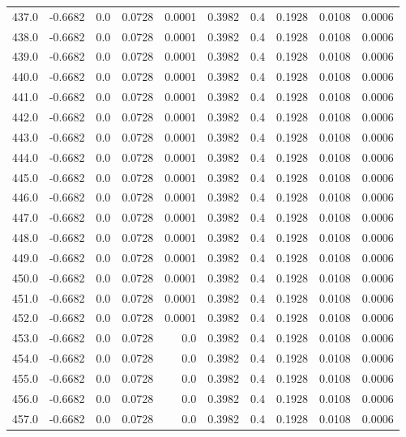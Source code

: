 \begin{longtable}{lrrrrrrrrr}
437.0 & -0.6682 & 0.0 & 0.0728 & 0.0001 & 0.3982 & 0.4 & 0.1928 & 0.0108 & 0.0006 \\
438.0 & -0.6682 & 0.0 & 0.0728 & 0.0001 & 0.3982 & 0.4 & 0.1928 & 0.0108 & 0.0006 \\
439.0 & -0.6682 & 0.0 & 0.0728 & 0.0001 & 0.3982 & 0.4 & 0.1928 & 0.0108 & 0.0006 \\
440.0 & -0.6682 & 0.0 & 0.0728 & 0.0001 & 0.3982 & 0.4 & 0.1928 & 0.0108 & 0.0006 \\
441.0 & -0.6682 & 0.0 & 0.0728 & 0.0001 & 0.3982 & 0.4 & 0.1928 & 0.0108 & 0.0006 \\
442.0 & -0.6682 & 0.0 & 0.0728 & 0.0001 & 0.3982 & 0.4 & 0.1928 & 0.0108 & 0.0006 \\
443.0 & -0.6682 & 0.0 & 0.0728 & 0.0001 & 0.3982 & 0.4 & 0.1928 & 0.0108 & 0.0006 \\
444.0 & -0.6682 & 0.0 & 0.0728 & 0.0001 & 0.3982 & 0.4 & 0.1928 & 0.0108 & 0.0006 \\
445.0 & -0.6682 & 0.0 & 0.0728 & 0.0001 & 0.3982 & 0.4 & 0.1928 & 0.0108 & 0.0006 \\
446.0 & -0.6682 & 0.0 & 0.0728 & 0.0001 & 0.3982 & 0.4 & 0.1928 & 0.0108 & 0.0006 \\
447.0 & -0.6682 & 0.0 & 0.0728 & 0.0001 & 0.3982 & 0.4 & 0.1928 & 0.0108 & 0.0006 \\
448.0 & -0.6682 & 0.0 & 0.0728 & 0.0001 & 0.3982 & 0.4 & 0.1928 & 0.0108 & 0.0006 \\
449.0 & -0.6682 & 0.0 & 0.0728 & 0.0001 & 0.3982 & 0.4 & 0.1928 & 0.0108 & 0.0006 \\
450.0 & -0.6682 & 0.0 & 0.0728 & 0.0001 & 0.3982 & 0.4 & 0.1928 & 0.0108 & 0.0006 \\
451.0 & -0.6682 & 0.0 & 0.0728 & 0.0001 & 0.3982 & 0.4 & 0.1928 & 0.0108 & 0.0006 \\
452.0 & -0.6682 & 0.0 & 0.0728 & 0.0001 & 0.3982 & 0.4 & 0.1928 & 0.0108 & 0.0006 \\
453.0 & -0.6682 & 0.0 & 0.0728 & 0.0 & 0.3982 & 0.4 & 0.1928 & 0.0108 & 0.0006 \\
454.0 & -0.6682 & 0.0 & 0.0728 & 0.0 & 0.3982 & 0.4 & 0.1928 & 0.0108 & 0.0006 \\
455.0 & -0.6682 & 0.0 & 0.0728 & 0.0 & 0.3982 & 0.4 & 0.1928 & 0.0108 & 0.0006 \\
456.0 & -0.6682 & 0.0 & 0.0728 & 0.0 & 0.3982 & 0.4 & 0.1928 & 0.0108 & 0.0006 \\
457.0 & -0.6682 & 0.0 & 0.0728 & 0.0 & 0.3982 & 0.4 & 0.1928 & 0.0108 & 0.0006 \\

\end{longtable}
